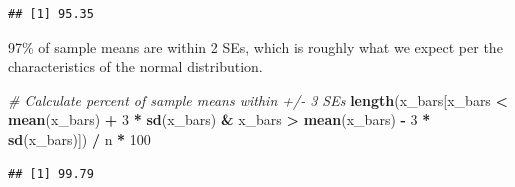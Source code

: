 \documentclass[]{book}
\newenvironment{Shaded}{\begin{snugshade}}{\end{snugshade}}
\newcommand{\CommentTok}[1]{\textcolor[rgb]{0.56,0.35,0.01}{\textit{#1}}}
\newcommand{\DecValTok}[1]{\textcolor[rgb]{0.00,0.00,0.81}{#1}}
\newcommand{\KeywordTok}[1]{\textcolor[rgb]{0.13,0.29,0.53}{\textbf{#1}}}
\newcommand{\NormalTok}[1]{#1}
\newcommand{\OperatorTok}[1]{\textcolor[rgb]{0.81,0.36,0.00}{\textbf{#1}}}
\newcommand{\StringTok}[1]{\textcolor[rgb]{0.31,0.60,0.02}{#1}}
\begin{document}
\begin{Shaded}
\end{Shaded}

\begin{verbatim}
## [1] 95.35
\end{verbatim}

97\% of sample means are within 2 SEs, which is roughly what we expect per the characteristics of the normal distribution.

\begin{Shaded}
\begin{Highlighting}[]
\CommentTok{# Calculate percent of sample means within +/- 3 SEs}
\KeywordTok{length}\NormalTok{(x_bars[x_bars }\OperatorTok{<}\StringTok{ }\KeywordTok{mean}\NormalTok{(x_bars) }\OperatorTok{+}\StringTok{ }\DecValTok{3} \OperatorTok{*}\StringTok{ }\KeywordTok{sd}\NormalTok{(x_bars) }\OperatorTok{&}\StringTok{ }\NormalTok{x_bars }\OperatorTok{>}\StringTok{ }\KeywordTok{mean}\NormalTok{(x_bars) }\OperatorTok{-}\StringTok{ }\DecValTok{3} \OperatorTok{*}\StringTok{ }\KeywordTok{sd}\NormalTok{(x_bars)]) }\OperatorTok{/}\StringTok{ }\NormalTok{n }\OperatorTok{*}\StringTok{ }\DecValTok{100}
\end{Highlighting}
\end{Shaded}

\begin{verbatim}
## [1] 99.79
\end{verbatim}
\end{document}
